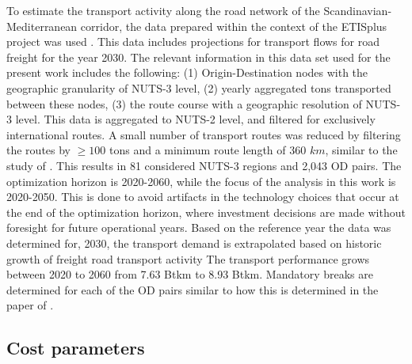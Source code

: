 \documentclass[preprint,10pt,review, authoryear]{elsarticle}
\begin{document}
        To estimate the transport activity along the road network of the Scandinavian-Mediterranean corridor, the data prepared within the context of the ETISplus project was used \citep{Speth2021}. This data includes projections for transport flows for road freight for the year 2030. The relevant information in this data set used for the present work includes the following: (1) Origin-Destination nodes with the geographic granularity of NUTS-3 level, (2) yearly aggregated tons transported between these nodes, (3) the route course with a geographic resolution of NUTS-3 level. This data is aggregated to NUTS-2 level, and filtered for exclusively international routes. A small number of transport routes was reduced by filtering the routes by $\geq 100$ tons and a minimum route length of 360 $km$, similar to the study of \citet{SHOMAN2023103825}. This results in 81 considered NUTS-3 regions and 2,043 OD pairs. The optimization horizon is 2020-2060, while the focus of the analysis in this work is 2020-2050. This is done to avoid artifacts in the technology choices that occur at the end of the optimization horizon, where investment decisions are made without foresight for future operational years. Based on the reference year the data was determined for, 2030, the transport demand is extrapolated based on historic growth of freight road transport activity \citep{eurostat2024roadfreight} The transport performance grows between 2020 to 2060 from 7.63 Btkm to 8.93 Btkm. Mandatory breaks are determined for each of the OD pairs similar to how this is determined in the paper of \citet{SHOMAN2023103825}.

        
    \subsection{Cost parameters}
    
\end{document}
